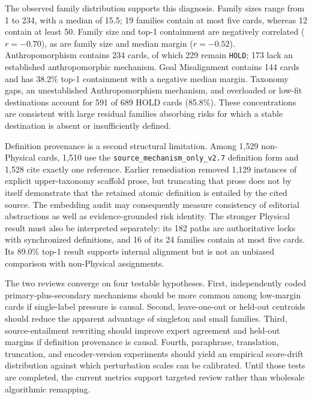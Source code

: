 \documentclass[11pt,a4paper]{article}
\newcommand{\code}[1]{\texttt{#1}}
\begin{document}
The observed family distribution supports this diagnosis. Family sizes range
from 1 to 234, with a median of 15.5; 19 families contain at most five cards,
whereas 12 contain at least 50. Family size and top-1 containment are negatively
correlated ($r=-0.70$), as are family size and median margin ($r=-0.52$).
Anthropomorphism contains 234 cards, of which 229 remain \code{HOLD}; 173 lack
an established anthropomorphic mechanism. Goal Misalignment contains 144
cards and has 38.2\% top-1 containment with a negative median margin. Taxonomy
gaps, an unestablished Anthropomorphism mechanism, and overloaded or low-fit
destinations account for 591 of 689 HOLD cards (85.8\%). These concentrations
are consistent with large residual families absorbing risks for which a
stable destination is absent or insufficiently defined.

Definition provenance is a second structural limitation. Among 1,529
non-Physical cards, 1,510 use the
\nolinkurl{source_mechanism_only_v2.7} definition
form and 1,528 cite exactly one reference. Earlier remediation removed 1,129
instances of explicit upper-taxonomy scaffold prose, but truncating that prose
does not by itself demonstrate that the retained atomic definition is entailed
by the cited source. The embedding audit may consequently measure consistency
of editorial abstractions as well as evidence-grounded risk identity. The
stronger Physical result must also be interpreted separately: its 182 paths
are authoritative locks with synchronized definitions, and 16 of its 24
families contain at most five cards. Its 89.0\% top-1 result supports internal
alignment but is not an unbiased comparison with non-Physical assignments.

The two reviews converge on four testable hypotheses. First, independently
coded primary-plus-secondary mechanisms should be more common among low-margin
cards if single-label pressure is causal. Second, leave-one-out or held-out
centroids should reduce the apparent advantage of singleton and small
families. Third, source-entailment rewriting should improve expert agreement
and held-out margins if definition provenance is causal. Fourth, paraphrase,
translation, truncation, and encoder-version experiments should yield an
empirical score-drift distribution against which perturbation scales can be
calibrated. Until those tests are completed, the current metrics support
targeted review rather than wholesale algorithmic remapping.
\end{document}
